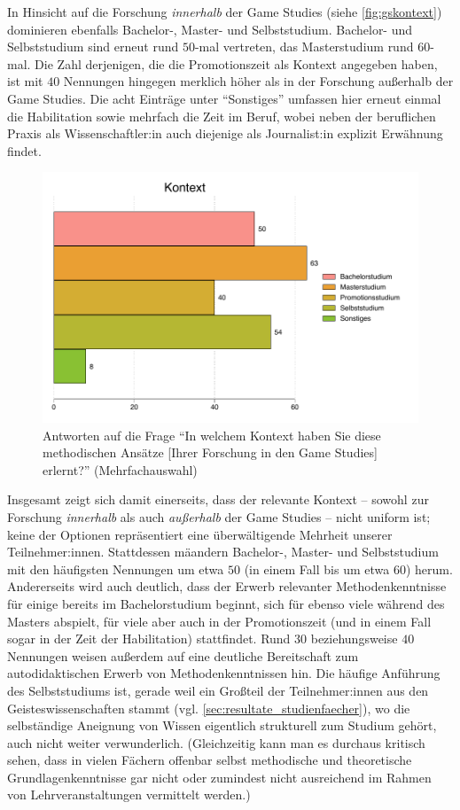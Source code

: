 \documentclass{scrartcl}
\begin{document}
In Hinsicht auf die Forschung \textit{innerhalb} der Game Studies (siehe \autoref{fig:gskontext}) dominieren ebenfalls Bachelor-, Master- und Selbststudium.
Bachelor- und Selbststudium sind erneut rund $50$-mal vertreten, das Masterstudium rund $60$-mal.
Die Zahl derjenigen, die die Promotionszeit als Kontext angegeben haben, ist mit $40$ Nennungen hingegen merklich höher als in der Forschung außerhalb der Game Studies.
Die acht Einträge unter \enquote{Sonstiges} umfassen hier erneut einmal die Habilitation sowie mehrfach die Zeit im Beruf, wobei neben der beruflichen Praxis als Wissenschaftler:in auch diejenige als Journalist:in explizit Erwähnung findet.

\begin{figure}[ht]
   \includegraphics[width=1\textwidth]{gskontext.pdf}
   \caption{Antworten auf die Frage \enquote{In welchem Kontext haben Sie diese methodischen Ansätze [Ihrer Forschung in den Game Studies] erlernt?} (Mehrfachauswahl)}
   \label{fig:gskontext}
\end{figure}

Insgesamt zeigt sich damit einerseits, dass der relevante Kontext -- sowohl zur Forschung \textit{innerhalb} als auch \textit{außerhalb} der Game Studies -- nicht uniform ist; keine der Optionen repräsentiert eine überwältigende Mehrheit unserer Teilnehmer:innen.
Stattdessen mäandern Bachelor-, Master- und Selbststudium mit den häufigsten Nennungen um etwa $50$ (in einem Fall bis um etwa $60$) herum.
Andererseits wird auch deutlich, dass der Erwerb relevanter Methodenkenntnisse für einige bereits im Bachelorstudium beginnt, sich für ebenso viele während des Masters abspielt, für viele aber auch in der Promotionszeit (und in einem Fall sogar in der Zeit der Habilitation) stattfindet.
Rund $30$ beziehungsweise $40$ Nennungen weisen außerdem auf eine deutliche Bereitschaft zum autodidaktischen Erwerb von Methodenkenntnissen hin.
Die häufige Anführung des Selbststudiums ist, gerade weil ein Großteil der Teilnehmer:innen aus den Geisteswissenschaften stammt (vgl. \autoref{sec:resultate_studienfaecher}), wo die selbständige Aneignung von Wissen eigentlich strukturell zum Studium gehört, auch nicht weiter verwunderlich.
(Gleichzeitig kann man es durchaus kritisch sehen, dass in vielen Fächern offenbar selbst methodische und theoretische Grundlagenkenntnisse gar nicht oder zumindest nicht ausreichend im Rahmen von Lehrveranstaltungen vermittelt werden.)
\end{document}
